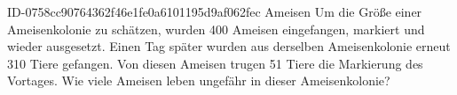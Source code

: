 \begin{exercise}
      {ID-0758cc90764362f46e1fe0a6101195d9af062fec}
      {Ameisen}
  \ifproblem\problem
    Um die Größe einer Ameisenkolonie zu schätzen, wurden 400 Ameisen eingefangen,
    markiert und wieder ausgesetzt. Einen Tag später wurden aus derselben
    Ameisenkolonie erneut 310 Tiere gefangen. Von diesen Ameisen trugen 51 Tiere
    die Markierung des Vortages. Wie viele Ameisen leben ungefähr in dieser
    Ameisenkolonie?
  \fi
\end{exercise}
